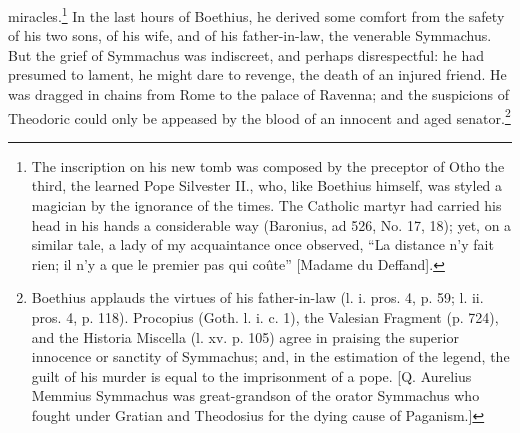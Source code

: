 miracles.\footnote{The inscription on his new tomb was composed by the preceptor of Otho the third, the learned Pope Silvester II., who, like Boethius himself, was styled a magician by the ignorance of the times. The Catholic martyr had carried his head in his hands a considerable way (Baronius, ad 526, No. 17, 18); yet, on a similar tale, a lady of my acquaintance once observed, \texthebrew{“}La distance n\texthebrew{}’y fait rien; il n\texthebrew{}’y a que le premier pas qui coûte\texthebrew{}” [Madame du Deffand].} In the last hours of Boethius, he derived some comfort from the safety of his two sons, of his wife, and of his father-in-law, the venerable Symmachus. But the grief of Symmachus was indiscreet, and perhaps disrespectful: he had presumed to lament, he might dare to revenge, the death of an injured friend. He was dragged in chains from Rome to the palace of Ravenna; and the suspicions of Theodoric could only be appeased by the blood of an innocent and aged senator.\footnote{Boethius applauds the virtues of his father-in-law (l. i. pros. 4, p. 59; l. ii. pros. 4, p. 118). Procopius (Goth. l. i. c. 1), the Valesian Fragment (p. 724), and the Historia Miscella (l. xv. p. 105) agree in praising the superior innocence or sanctity of Symmachus; and, in the estimation of the legend, the guilt of his murder is equal to the imprisonment of a pope. [Q. Aurelius Memmius Symmachus was great-grandson of the orator Symmachus who fought under Gratian and Theodosius for the dying cause of Paganism.]}

